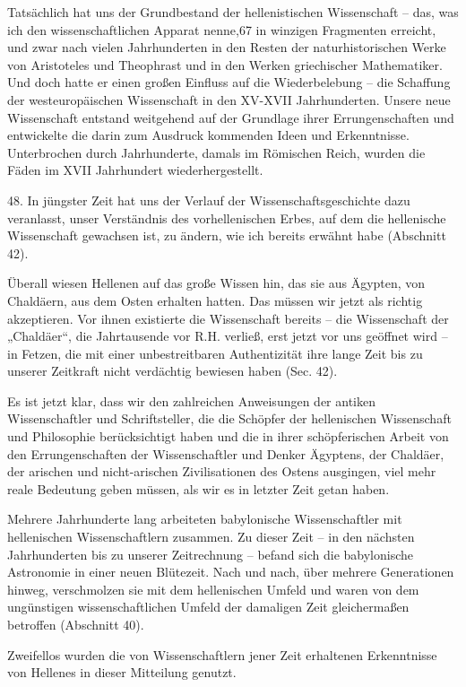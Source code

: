 \documentclass[11pt,a4paper]{book}
\begin{document}
Tatsächlich hat uns der Grundbestand der hellenistischen Wissenschaft -- das, was ich den wissenschaftlichen Apparat nenne,67 in winzigen Fragmenten erreicht, und zwar nach vielen Jahrhunderten in den Resten der naturhistorischen Werke von Aristoteles und Theophrast und in den Werken griechischer Mathematiker. Und doch hatte er einen großen Einfluss auf die Wiederbelebung -- die Schaffung der westeuropäischen Wissenschaft in den XV-XVII Jahrhunderten. Unsere neue Wissenschaft entstand weitgehend auf der Grundlage ihrer Errungenschaften und entwickelte die darin zum Ausdruck kommenden Ideen und Erkenntnisse. Unterbrochen durch Jahrhunderte, damals im Römischen Reich, wurden die Fäden im XVII Jahrhundert wiederhergestellt. 

48. In jüngster Zeit hat uns der Verlauf der Wissenschaftsgeschichte dazu veranlasst, unser Verständnis des vorhellenischen Erbes, auf dem die hellenische Wissenschaft gewachsen ist, zu ändern, wie ich bereits erwähnt habe (Abschnitt 42). 

Überall wiesen Hellenen auf das große Wissen hin, das sie aus Ägypten, von Chaldäern, aus dem Osten erhalten hatten. Das müssen wir jetzt als richtig akzeptieren. Vor ihnen existierte die Wissenschaft bereits -- die Wissenschaft der „Chaldäer“, die Jahrtausende vor R.H. verließ, erst jetzt vor uns geöffnet wird -- in Fetzen, die mit einer unbestreitbaren Authentizität ihre lange Zeit bis zu unserer Zeitkraft nicht verdächtig bewiesen haben (Sec. 42). 

Es ist jetzt klar, dass wir den zahlreichen Anweisungen der antiken Wissenschaftler und Schriftsteller, die die Schöpfer der hellenischen Wissenschaft und Philosophie berücksichtigt haben und die in ihrer schöpferischen Arbeit von den Errungenschaften der Wissenschaftler und Denker Ägyptens, der Chaldäer, der arischen und nicht-arischen Zivilisationen des Ostens ausgingen, viel mehr reale Bedeutung geben müssen, als wir es in letzter Zeit getan haben. 

Mehrere Jahrhunderte lang arbeiteten babylonische Wissenschaftler mit hellenischen Wissenschaftlern zusammen. Zu dieser Zeit -- in den nächsten Jahrhunderten bis zu unserer Zeitrechnung -- befand sich die babylonische Astronomie in einer neuen Blütezeit. Nach und nach, über mehrere Generationen hinweg, verschmolzen sie mit dem hellenischen Umfeld und waren von dem ungünstigen wissenschaftlichen Umfeld der damaligen Zeit gleichermaßen betroffen (Abschnitt 40). 

Zweifellos wurden die von Wissenschaftlern jener Zeit erhaltenen Erkenntnisse von Hellenes in dieser Mitteilung genutzt. 
\end{document}
